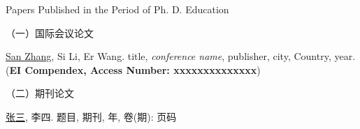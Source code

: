 
{} {Papers
Published in the Period of Ph. D. Education}

（一）国际会议论文
\begin{publist}
\item \underline{San Zhang}, Si Li, Er Wang. title, \textit{conference
    name}, publisher, city, Country, year. (\textbf{EI Compendex,
    Access Number: xxxxxxxxxxxxxx})

\end{publist}

（二）期刊论文
\begin{publist}
\item \underline{张三}, 李四. 题目, 期刊, 年, 卷(期): 页码
\end{publist}
 





\ifoneortwoside
\newpage
~~~\vspace{1em}
\thispagestyle{empty}
\fi



